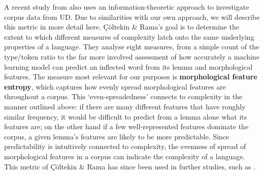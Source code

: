 \documentclass[USenglish]{article}
\begin{document}
A recent study from \citet{ccoltekin2023complexity} also uses an information-theoretic approach to investigate corpus data from UD. 
Due to similarities with our own approach, we will describe this metric in more detail here.
Çöltekin \& Rama's goal is to determine the extent to which different measures of complexity latch onto the same underlying properties of a language. 
They analyse eight measures, from a simple count of the type/token ratio to the far more involved assessment of how accurately a machine learning model can predict an inflected word from its lemma and morphological features.
The measure most relevant for our purposes is \textbf{morphological feature entropy}, which captures how evenly spread morphological features are throughout a corpus.
This `even-spreadedness' connects to complexity in the manner outlined above: if there are many different features that have roughly similar frequency, it would be difficult to predict from a lemma alone what its features are; on the other hand if a few well-represented features dominate the corpus, a given lemma's features are likely to be more predictable.
Since predictability is intuitively connected to complexity, the evenness of spread of morphological features in a corpus can indicate the complexity of a language.
This metric of Çöltekin \& Rama has since been used in further studies, such as \citet{bentz2023complexity}.
\end{document}
